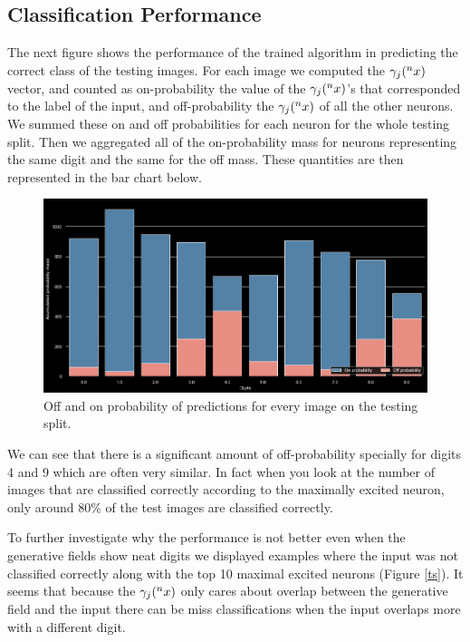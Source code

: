 \documentclass{article}
\begin{document}
\subsection{Classification Performance}
The next figure shows the performance of the trained algorithm in predicting the correct class of the testing images. For each image we computed the \(\gamma_j(\prescript{n}{}{x})\) vector, and counted as on-probability the value of the \(\gamma_j(\prescript{n}{}{x})\)'s that corresponded to the label of the input, and off-probability the  \(\gamma_j(\prescript{n}{}{x})\) of all the other neurons. We summed these on and off probabilities for each neuron for the whole testing split. Then we aggregated all of the on-probability mass for neurons representing the same digit and the same for the off mass. These quantities are then represented in the bar chart below.
 
\begin{figure}[h]
   \includegraphics[width=\textwidth]{img/output_47_0.png}
   \caption{Off and on probability of predictions for every image on the testing split. \label{on-off}}
\end{figure}
 
We can see that there is a significant amount of off-probability specially for digits 4 and 9 which are often very similar. In fact when you look at the number of images that are classified correctly according to the maximally excited neuron, only around 80\% of the test images are classified correctly.
 
To further investigate why the performance is not better even when the generative fields show neat digits we displayed examples where the input was not classified correctly along with the top 10 maximal excited neurons (Figure \ref{ts}). It seems that because the \(\gamma_j(\prescript{n}{}{x})\) only cares about overlap between the generative field and the input there can be miss classifications when the input overlaps more with a different digit.
 
\end{document}
